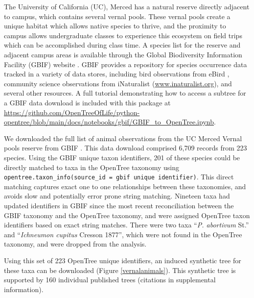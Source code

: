 \documentclass[oupdraft]{sysbio_sse}
\begin{document}
\bigskip

The University of California (UC), Merced has a natural reserve directly adjacent to campus, which contains several vernal pools. These vernal pools create a unique habitat which allows native species to thrive, and the proximity to campus allows undergraduate classes to experience this ecosystem on field trips which can be accomplished during class time.
A species list for the reserve and adjacent campus areas is available through the Global Biodiversity Information Facility (GBIF) website \citep{gbif_secretariat_gbif_2019}. GBIF provides a repository for species occurrence data tracked in a variety of data stores, including bird observations from eBird \citep{sullivan_ebird_2009}, community science observations from iNaturalist (\url{www.inaturalist.org}), and several other resources. A full tutorial demonstrating how to access a subtree for a GBIF data download is included with this package at \url{https://github.com/OpenTreeOfLife/python-opentree/blob/main/docs/notebooks/gbif/GBIF_to_OpenTree.ipynb}.

We downloaded the full list of animal observations from the UC Merced Vernal pools reserve from GBIF \citep{gbif_secretariat_gbif_2019}. This data download comprised 6,709 records from 223 species. Using the GBIF unique taxon identifiers, 201 of these species could be directly matched to taxa in the OpenTree taxonomy using \texttt{opentree.taxon\_info(source\_id = {gbif unique identifier})}. This direct matching captures exact one to one relationships between these taxonomies, and avoids slow and potentially error prone string matching. Nineteen taxa had updated identifiers in GBIF since the most recent reconciliation between the GBIF taxonomy and the OpenTree taxonomy, and were assigned OpenTree taxon identifiers based on exact string matches. There were two taxa ``\textit{P. abortivum} St.'' and ``\textit{Ichneumon cupitus} Cresson 1877'', which were not found in the OpenTree taxonomy, and were dropped from the analysis.


Using this set of 223 OpenTree unique identifiers, an induced synthetic tree for these taxa can be downloaded (Figure \ref{vernalanimals}). This synthetic tree is supported by 160 individual published trees (citations in supplemental information).
\end{document}
